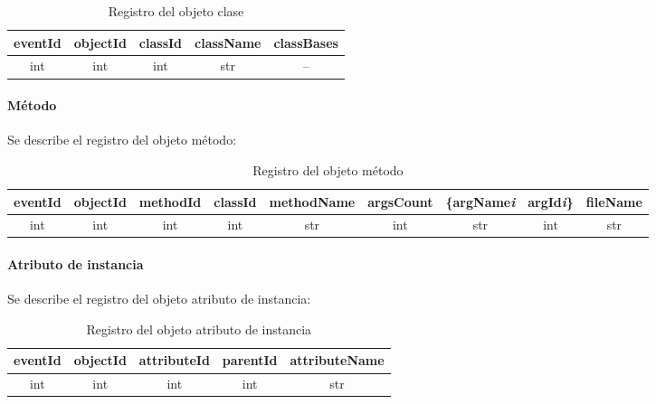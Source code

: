 \documentclass[12pt,legalpaper]{report}
\begin{document}
\begin{table}[!h]
\begin{center}
\begin{tabular}{| c | c | c | c | c |}
\hline
\rowcolor[gray]{0.9}eventId & objectId & classId & className & classBases\\
\hline
int & int & int & str & --\footnotemark[1]\\
\hline
\end{tabular}
\caption{Registro del objeto clase} 
\end{center}
\end{table}


				\paragraph{Método}
Se describe el registro del objeto método:\\

\begin{table}[!h]
\begin{center}
\begin{footnotesize}
\begin{tabular}{| c | c | c | c | c | c | c | c | c |}
\hline
\rowcolor[gray]{0.9}eventId & objectId & methodId & classId & methodName & argsCount & \{argName\textit{{\scriptsize  i}} & argId\textit{{\scriptsize  i}}\} & fileName\\
\hline
int & int & int & int & str & int & str & int & str\\
\hline
\end{tabular}
\caption{Registro del objeto método} 
\end{footnotesize}
\end{center}
\end{table}

				\paragraph{Atributo de instancia}
Se describe el registro del objeto atributo de instancia:\\

\begin{table}[!h]
\begin{center}
\begin{tabular}{| c | c | c | c | c |}
\hline
\rowcolor[gray]{0.9}eventId & objectId & attributeId & parentId & attributeName\\
\hline
int & int & int & int & str\\
\hline
\end{tabular}
\caption{Registro del objeto atributo de instancia} 
\end{center}
\end{table}
\end{document}

